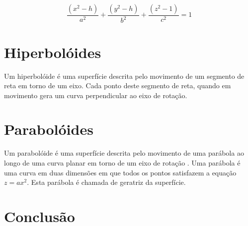 \documentclass[
	article,			%
	11pt,				%
	oneside,			%
	a4paper,			%
	english,			%
	brazil,				%
	]{abntex2}
\begin{document}
			$$\frac{(x^2-h)}{a^2}+\frac{(y^2-h)}{b^2}+\frac{(z^2-1)}{c^2}=1$$



	\section{Hiperbolóides} 

	Um hiperbolóide é uma superfície descrita pelo movimento de um segmento de
	reta em torno de um eixo. Cada ponto deste segmento de reta, quando em
	movimento gera um curva perpendicular ao eixo de rotação.

	\section{Parabolóides}

	Um parabolóide é uma superfície descrita pelo movimento de uma parábola ao
	longo de uma curva planar em torno de um eixo de rotação . Uma parábola é
	uma curva em duas dimensões em que todos os pontos satisfazem a equação
	$z = ax^2$. Esta parábola é chamada de geratriz da superfície.

	\section{Conclusão}
    
	 \nocite{boulos1997} \nocite{winterle2000vetores}
	
\end{document}
